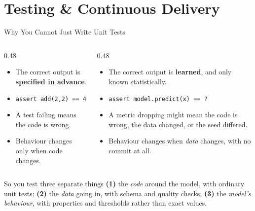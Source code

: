 \section{Testing \& Continuous Delivery}

\begin{frame}{Why You Cannot Just Write Unit Tests}

    \centering
    \begin{columns}[T]
        \begin{column}{0.48\textwidth}
            \begin{tcolorbox}[colback=blue!5, colframe=blue!50, title=\small Ordinary software]
                \small
                \begin{itemize}
                    \item The correct output is \textbf{specified in advance}.
                    \item \texttt{assert add(2,2) == 4}
                    \item A test failing means the code is wrong.
                    \item Behaviour changes only when code changes.
                \end{itemize}
            \end{tcolorbox}
        \end{column}
        \begin{column}{0.48\textwidth}
            \begin{tcolorbox}[colback=red!5, colframe=red!50, title=\small Machine learning]
                \small
                \begin{itemize}
                    \item The correct output is \textbf{learned}, and only known statistically.
                    \item \texttt{assert model.predict(x) == ?}
                    \item A metric dropping might mean the code is wrong, the data changed, or the seed
                          differed.
                    \item Behaviour changes when \emph{data} changes, with no commit at all.
                \end{itemize}
            \end{tcolorbox}
        \end{column}
    \end{columns}

    \vspace{0.9em}
    \begin{block}{So you test three separate things}
        \textbf{(1)} the \emph{code} around the model, with ordinary unit tests;
        \textbf{(2)} the \emph{data} going in, with schema and quality checks;
        \textbf{(3)} the \emph{model's behaviour}, with properties and thresholds rather than exact values.
    \end{block}

\end{frame}
